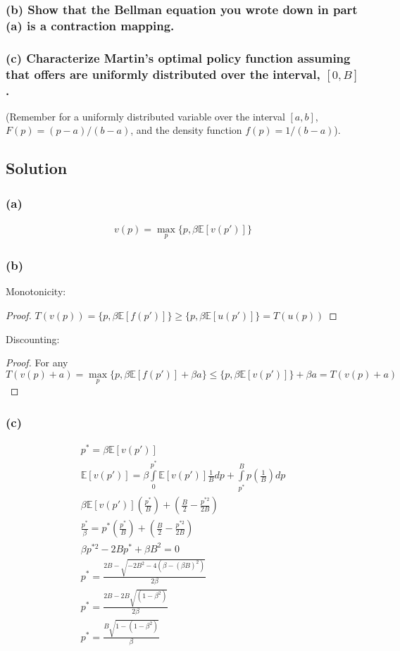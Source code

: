 \documentclass[10pt, a4paper]{article}
\begin{document}
    \subsubsection*{(b) Show that the Bellman equation you wrote down in part (a) is a contraction mapping.}

    \subsubsection*{(c) Characterize Martin's optimal policy function assuming that offers are uniformly distributed over the interval, $[0, B]$.}
    (Remember for a uniformly distributed variable over the interval $[a, b]$, $F(p) = (p-a)/(b-a)$, and the density function $f(p) = 1/(b-a)$).

  \subsection*{Solution}
  \subsubsection*{(a)}
    \begin{gather*}
      v(p) = \max\limits_p\{p, \beta\mathbb{E}[v(p')]\}
    \end{gather*}
  \subsubsection*{(b)}
    Monotonicity:
    \begin{proof}
      $T(v(p)) = \{p, \beta\mathbb{E}[f(p')]\}\geq\{p,\beta\mathbb{E}[u(p')]\}=T(u(p))$
    \end{proof}
    Discounting:
    \begin{proof}
      For any $T(v(p)+a) = \max\limits_p\{p, \beta\mathbb{E}[f(p')]+\beta a\}\leq\{p, \beta\mathbb{E}[v(p')]\}+\beta a=T(v(p)+a)$
    \end{proof}
  \subsubsection*{(c)}
    \begin{gather*}
      p^* = \beta\mathbb{E}[v(p')]\\
      \mathbb{E}[v(p')] = \beta\int\limits_0^{p^*}\mathbb{E}[v(p')]\frac{1}{B}dp + \int\limits_{p^*}^{B}p(\frac{1}{B})dp\\
      \beta\mathbb{E}[v(p')](\frac{p^*}{B}) + (\frac{B}{2}-\frac{p^{*2}}{2B}) \\
      \frac{p^*}{\beta} = p^*(\frac{p^*}{B})+(\frac{B}{2}-\frac{p^{*2}}{2B}) \\
      \beta p^{*2} -2Bp^*+\beta B^2 = 0 \\
      p^* = \frac{2B - \sqrt{-2B^2 - 4(\beta - (\beta B)^2 )}}{2\beta} \\
      p^* = \frac{2B - 2B\sqrt{(1-\beta^2)}}{2\beta}\\
      \boxed{p^* = \frac{B\sqrt{1-(1-\beta^2)}}{\beta}}
    \end{gather*}
\end{document}
